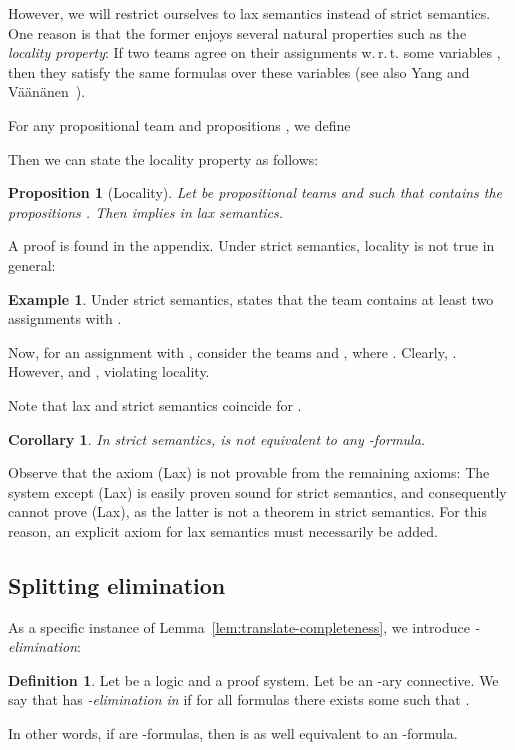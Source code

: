 \documentclass[a4paper,english,fleqn,11pt,final]{scrartcl}
\makeatletter
\newcommand{\wrt}{w.\,r.\,t.\@\xspace}
\newcommand{\Deriv}[1]{{\normalfont\textsf{#1}}}
\theoremstyle{plain}
\newtheorem{proposition}[theorem]{Proposition}
\newtheorem{corollary}[theorem]{Corollary}
\theoremstyle{definition}
\newtheorem{definition}[theorem]{Definition}
\newtheorem{example}[theorem]{Example}
\makeatother
\begin{document}
However, we will restrict ourselves to lax semantics instead of strict semantics.
One reason is that the former enjoys several natural properties such as the \emph{locality property}: If two teams agree on their assignments \wrt some variables , then they satisfy the same formulas over these variables (see also Yang and Väänänen~\cite{yang_propositional_2017}).

For any propositional team  and propositions , we define

Then we can state the locality property as follows:
\begin{proposition}[Locality]\label{prop:locality}
Let  be propositional teams and  such that  contains the propositions .
Then  implies  in lax semantics.
\end{proposition}

A proof is found in the appendix.
Under strict semantics, locality is not true in general:

\begin{example}
Under strict semantics,  states that the team contains at least two assignments  with .

Now, for an assignment  with , consider the teams  and , where .
Clearly, .
However,  and , violating locality.
\end{example}

Note that lax and strict semantics coincide for .

\label{p:count}

\begin{corollary}\label{cor:no-counting}
In strict semantics,  is not equivalent to any -formula.
\end{corollary}


Observe that the axiom \Deriv{(Lax)} is not provable from the remaining axioms:
The system  except \Deriv{(Lax)} is easily proven sound for strict semantics, and consequently cannot prove \Deriv{(Lax)}, as the latter is not a theorem in strict semantics.
For this reason, an explicit axiom for lax semantics must necessarily be added.



\subsection{Splitting elimination}



As a specific instance of Lemma~\ref{lem:translate-completeness}, we introduce \emph{-elimination}:

\begin{definition}\label{def:f-elim}
	Let  be a logic and  a proof system. Let  be an -ary connective.
	We say that  has \emph{-elimination in } if for all formulas  there exists some  such that .
\end{definition}
In other words, if  are -formulas, then  is as well equivalent to an -formula.
\end{document}
